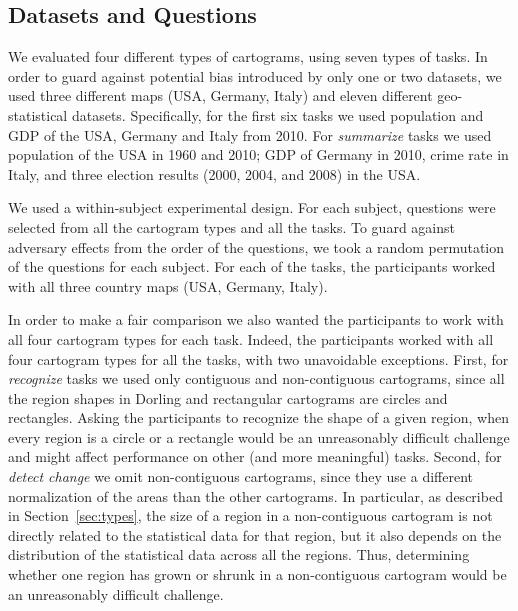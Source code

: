 \documentclass[10pt,journal,compsoc]{IEEEtran}
\begin{document}
\subsection{Datasets and Questions}

We evaluated four different types of cartograms, using seven types of tasks. In order to guard against potential bias introduced by only one or two datasets, we used three different maps (USA, Germany, Italy) and eleven different geo-statistical datasets. Specifically, for the first six tasks we used population and GDP of the USA, Germany and Italy from 2010. For \textit{summarize} tasks we used population of the USA in 1960 and 2010; GDP of Germany in 2010, crime rate in Italy, and three election results (2000, 2004, and 2008) in the USA. 

We used a within-subject experimental design. 
For each subject, questions were selected from all the cartogram types and all the tasks. To guard against adversary effects from the order of the questions, we took a random permutation of the questions for each subject. For each of the tasks, the participants worked with all three country maps (USA, Germany, Italy). 

In order to make a fair comparison we also wanted the participants to work with all four cartogram types for each task. Indeed, the participants worked with all four cartogram types for all the tasks, with two unavoidable exceptions. 
First, for \textit{recognize} tasks we used only contiguous and non-contiguous cartograms, since all the region shapes in Dorling and rectangular cartograms are circles and rectangles. Asking the participants to recognize the shape of a given region, when every region is a circle or a rectangle would be an unreasonably difficult challenge and might affect performance on other (and more meaningful) tasks.
Second, for \textit{detect change} we omit non-contiguous cartograms, since they use a different normalization of the areas than the other cartograms.
In particular, as described in Section~\ref{sec:types}, the size of a region in a non-contiguous cartogram is not directly related to the statistical data for that region, but it also depends on the distribution of the statistical data across all the regions. Thus, determining whether one region has grown or shrunk in a non-contiguous cartogram would be an unreasonably difficult challenge.
\end{document}

